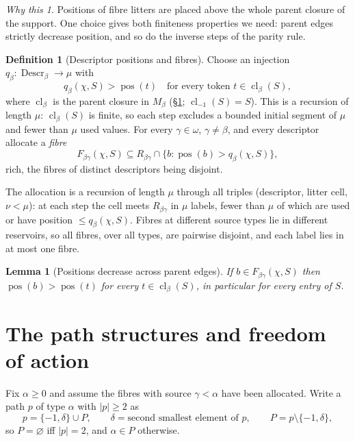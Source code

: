 \documentclass[11pt]{article}
\newtheorem{lemma}[theorem]{Lemma}
\theoremstyle{definition}
\newtheorem{definition}[theorem]{Definition}
\theoremstyle{remark}
\newtheorem*{idea}{Why this}
\newcommand{\cl}{\operatorname{cl}}
\newcommand{\pos}{\operatorname{pos}}
\newcommand{\Descr}{\operatorname{Descr}}
\begin{document}
\begin{idea}
Positions of fibre litters are placed above the whole parent closure of
the support. One choice gives both finiteness properties we need: parent
edges strictly decrease position, and so do the inverse steps of the
parity rule.
\end{idea}

\begin{definition}[Descriptor positions and fibres]\label{def:fibres}
Choose an injection \(q_\beta:\Descr_\beta\to\mu\) with
\[
 q_\beta(\chi,S)>\pos(t)\quad\text{for every token }t\in\cl_\beta(S),
\]
where \(\cl_\beta\) is the parent closure in \(M_\beta\)
(\S\ref{sec:aux}; \(\cl_{-1}(S)=S\)). This is a recursion of length
\(\mu\): \(\cl_\beta(S)\) is finite, so each step excludes a bounded
initial segment of \(\mu\) and fewer than \(\mu\) used values. For every
\(\gamma\in\omega\), \(\gamma\neq\beta\), and every descriptor allocate a
\emph{fibre}
\[
 F_{\beta\gamma}(\chi,S)\subseteq R_{\beta\gamma}\cap
 \{b:\pos(b)>q_\beta(\chi,S)\},
\]
rich, the fibres of distinct descriptors being disjoint.
\end{definition}

The allocation is a recursion of length \(\mu\) through all triples
(descriptor, litter cell, \(\nu<\mu\)): at each step the cell meets
\(R_{\beta\gamma}\) in \(\mu\) labels, fewer than \(\mu\) of which are
used or have position \(\leq q_\beta(\chi,S)\). Fibres at different
source types lie in different reservoirs, so all fibres, over all types,
are pairwise disjoint, and each label lies in at most one fibre.

\begin{lemma}[Positions decrease across parent edges]\label{lem:posdec}
If \(b\in F_{\beta\gamma}(\chi,S)\) then \(\pos(b)>\pos(t)\) for every
\(t\in\cl_\beta(S)\), in particular for every entry of \(S\).
\end{lemma}

\section{The path structures and freedom of action}\label{sec:aux}

Fix \(\alpha\geq0\) and assume the fibres with source \(\gamma<\alpha\)
have been allocated. Write a path \(p\) of type \(\alpha\) with
\(|p|\geq2\) as
\[
 p=\{-1,\delta\}\cup P,\qquad\delta=\text{second smallest element of }p,
 \qquad P=p\setminus\{-1,\delta\},
\]
so \(P=\varnothing\) iff \(|p|=2\), and \(\alpha\in P\) otherwise.
\end{document}
